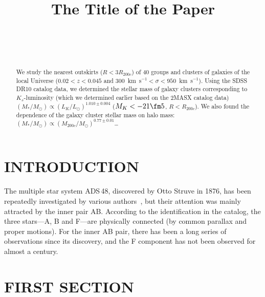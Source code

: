 \documentclass[
 aps, pra,
 amsmath,amssymb,
 11pt,
 final,
tightenlines,
 twoside,
 twocolumn,
 nofloats,
nofootinbib,
 superscriptaddress,
showkeys,
showkeywords,
 ]
{revtex4-2}
\begin{document}



\title{The Title of the Paper}

\author{~}

\author{~}
 \affiliation{\saoname}


\begin{abstract}
We study the nearest outskirts ($R<3R_{200c}$) of 40 groups and
clusters of galaxies of the local Universe ($0.02<z<0.045$ and
300~km~s$^{-1}<\sigma<950$~km~s$^{-1}$). Using the SDSS\,DR10
catalog data, we determined the stellar mass of galaxy clusters
corresponding to $K_s$-luminosity (which we determined earlier
based on the 2MASX catalog data) $(M_*/M_{\odot}) \propto
(L_K/L_{\odot})^{1.010\pm0.004}$ (\mbox{$M_K<-21\fm5$},
$R<R_{200c}$). We also found the dependence of the galaxy cluster
stellar mass on halo mass: \mbox{$(M_*/M_{\odot}) \propto
(M_{200c}/M_{\odot})^{0.77\pm0.01}$}\ldots
\end{abstract}

\maketitle

\section{INTRODUCTION}

The multiple star system ADS\,48, discovered by Otto Struve in 1876,
has been repeatedly investigated by various authors~\citep[see,
for example,][]{G-L, Hopman}, but their attention was mainly attracted
by the inner pair AB. According to the identification in the \citet{WDS}
catalog, the three stars---A, B and F---are physically connected
(by common parallax and proper motions). For the inner AB pair,
there has been a long series of observations since its discovery,
and the F component has not been observed for almost a century.


\section{FIRST SECTION}
\end{document}
